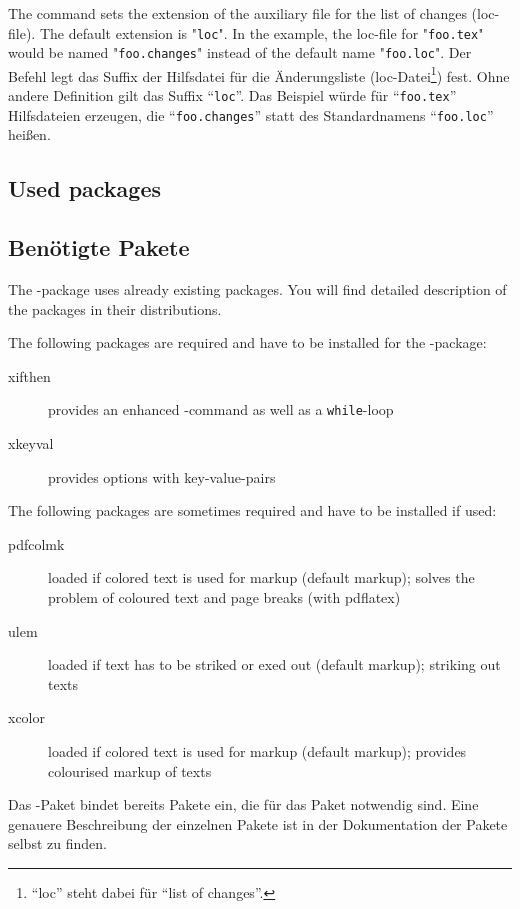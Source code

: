 \subsubsection{}
\DescribeMacro{\setlocextension}
\ifENGLISH
The command  sets the extension of the auxiliary file for the list of changes (loc-file).
The default extension is "\texttt{loc}".
In the example, the loc-file for "\texttt{foo.tex}" would be named "\texttt{foo.changes}" instead of the default name "\texttt{foo.loc}".
\fi
\ifGERMAN
	Der Befehl  legt das Suffix der Hilfsdatei für die Änderungsliste (loc-Datei\footnote{%
		"`loc"' steht dabei für "`list of changes"'.
	}) fest.
	Ohne andere Definition gilt das Suffix "`\texttt{loc}"'.
	Das Beispiel würde für "`\texttt{foo.tex}"' Hilfsdateien erzeugen, die "`\texttt{foo.changes}"' statt des Standardnamens "`\texttt{foo.loc}"' heißen.
\fi
\begin{chusage}
\>
\end{chusage}
\begin{chusage}[true]
\>
\end{chusage}

\ifENGLISH
\subsection{Used packages}
\fi
\ifGERMAN
	\subsection{Benötigte Pakete}
\fi
\label{sec:user:packages}

\ifENGLISH
The -package uses already existing packages.
You will find detailed description of the packages in their distributions.

The following packages are required and have to be installed for the -package:
\begin{description}
	\item [xifthen] provides an enhanced -command as well as a \texttt{while}-loop
	\item [xkeyval] provides options with key-value-pairs
\end{description}

The following packages are sometimes required and have to be installed if used:
\begin{description}
	\item [pdfcolmk] loaded if colored text is used for markup (default markup); solves the problem of coloured text and page breaks (with pdflatex)
	\item [ulem] loaded if text has to be striked or exed out (default markup); striking out texts
	\item [xcolor] loaded if colored text is used for markup (default markup); provides colourised markup of texts
\end{description}
\fi
\ifGERMAN
	Das -Paket bindet bereits Pakete ein, die für das Paket notwendig sind.
	Eine genauere Beschreibung der einzelnen Pakete ist in der Dokumentation der Pakete selbst zu finden.

